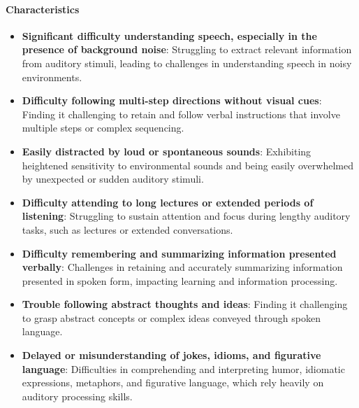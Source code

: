 \paragraph{Characteristics}
\begin{itemize}
    \item \textbf{Significant difficulty understanding speech, especially in the presence of background noise}: Struggling to extract relevant information from auditory stimuli, leading to challenges in understanding speech in noisy environments.
    \item \textbf{Difficulty following multi-step directions without visual cues}: Finding it challenging to retain and follow verbal instructions that involve multiple steps or complex sequencing.
    \item \textbf{Easily distracted by loud or spontaneous sounds}: Exhibiting heightened sensitivity to environmental sounds and being easily overwhelmed by unexpected or sudden auditory stimuli.
    \item \textbf{Difficulty attending to long lectures or extended periods of listening}: Struggling to sustain attention and focus during lengthy auditory tasks, such as lectures or extended conversations.
    \item \textbf{Difficulty remembering and summarizing information presented verbally}: Challenges in retaining and accurately summarizing information presented in spoken form, impacting learning and information processing.
    \item \textbf{Trouble following abstract thoughts and ideas}: Finding it challenging to grasp abstract concepts or complex ideas conveyed through spoken language.
    \item \textbf{Delayed or misunderstanding of jokes, idioms, and figurative language}: Difficulties in comprehending and interpreting humor, idiomatic expressions, metaphors, and figurative language, which rely heavily on auditory processing skills.
\end{itemize}

